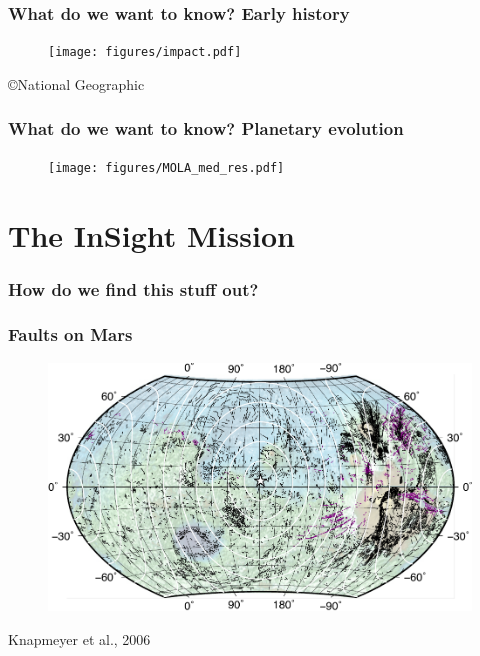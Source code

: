 \documentclass[compress,framenumber]{beamer}
\begin{document}
\begin{frame}
  \frametitle{What do we want to know? Early history}
  \vspace{-2.0em}
  \begin{figure}
    \texttt{[image: figures/impact.pdf]}
  \end{figure}
  \hfill \copyright National Geographic
\end{frame}

\begin{frame}
  \frametitle{What do we want to know? Planetary evolution}
  \vspace{-2.0em}
  \begin{figure}
    \texttt{[image: figures/MOLA\_med\_res.pdf]}
  \end{figure}
\end{frame}

\section{The InSight Mission}

\begin{frame}
  \frametitle{How do we find this stuff out?}

\end{frame}

\begin{frame}
  \frametitle{Faults on Mars}
  \vspace{-2.0em}
  \begin{figure}
    \includegraphics[width=0.95\linewidth]{figures/fault_map.pdf}
  \end{figure}
\vspace{-1.0em}
\hfill Knapmeyer et al., 2006
\end{frame}
\end{document}
